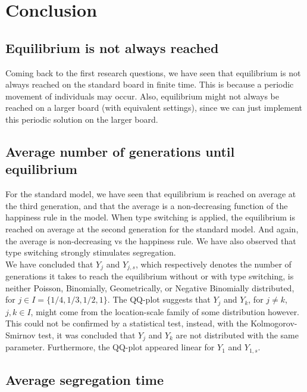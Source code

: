 \section{Conclusion}
\subsection{Equilibrium is not always reached}
Coming back to the first research questions, we have seen that equilibrium is not always reached on the standard board in finite time. This is because a periodic movement of individuals may occur. Also, equilibrium might not always be reached on a larger board (with equivalent settings), since we can just implement this periodic solution on the larger board.\\

\subsection{Average number of generations until equilibrium}
For the standard model, we have seen that equilibrium is reached on average at the third generation, and that the average is a non-decreasing function of the happiness rule in the model. When type switching is applied, the equilibrium is reached on average at the second generation for the standard model. And again, the average is non-decreasing vs the happiness rule. We have also observed that type switching strongly stimulates segregation.\\

We have concluded that $Y_j$ and $Y_{j,s}$, which respectively denotes the number of generations it takes to reach the equilibrium without or with type switching, is neither Poisson, Binomially, Geometrically, or Negative Binomially distributed, for $j\in I=\{1/4, 1/3, 1/2 ,1\}$. The QQ-plot suggests that $Y_j$ and $Y_k$, for $j\neq k$, $j,k\in I$, might come from the location-scale family of some distribution however. This could not be confirmed by a statistical test, instead, with the Kolmogorov-Smirnov test, it was concluded that $Y_j$ and $Y_k$ are not distributed with the same parameter. Furthermore, the QQ-plot appeared linear for $Y_1$ and $Y_{1,s}$.\\

\subsection{Average segregation time}

